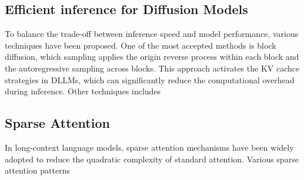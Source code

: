 \subsection{Efficient inference for Diffusion Models}
To balance the trade-off between inference speed and model performance, various techniques
have been proposed. One of the most accepted methods is block diffusion, which sampling
applies the origin reverse process within each block and the autoregressive sampling
across blocks. This approach activates the KV cachce strategies in DLLMs, which can 
significantly reduce the computational overhead during inference. Other techniques
includes 

\subsection{Sparse Attention}

In long-context language models, sparse attention mechanisms have been widely adopted to
reduce the quadratic complexity of standard attention. Various sparse attention patterns